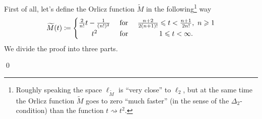 \documentclass[11pt]{amsart}
\theoremstyle{definition}
\theoremstyle{definition}
\theoremstyle{definition}
\theoremstyle{definition}
\theoremstyle{definition}
\theoremstyle{definition}
\theoremstyle{definition}
\theoremstyle{definition}
\numberwithin{equation}{section}
\numberwithin{equation}{section}
\numberwithin{equation}{section}
\theoremstyle{definition}
\theoremstyle{definition}
\theoremstyle{definition}
\theoremstyle{definition}
\theoremstyle{definition}
\theoremstyle{definition}
\renewenvironment{proof}{\noindent {\bf Proof.}}{\qed}
\begin{document}
\begin{proof}
	First of all, let's define the Orlicz function $\widetilde{M}$ in the following\footnote{Roughly speaking the space $\ell_{\widetilde{M}}$
	is \enquote{very close} to $\ell_2$, but at the same time the Orlicz function $\widetilde{M}$ goes to zero \enquote{much faster} (in the sense of the $\Delta_2$-condition)
	than the function $t \rightsquigarrow t^2$.} way
	\begin{equation*}
		\widetilde{M}(t) \coloneqq
		\begin{cases}
			\hfil \frac{2}{n!}t - \frac{1}{(n!)^2} & \text{ for } \quad \hfil \frac{n+2}{2(n+1)!} \leqslant t < \frac{n+1}{2n!},\ n \geqslant 1\\
			\hfil t^2  & \text{ for } \quad \hfil 1 \leqslant t < \infty.
		\end{cases}
	\end{equation*}
	We divide the proof into three parts.
	

\end{proof}
\end{document}
